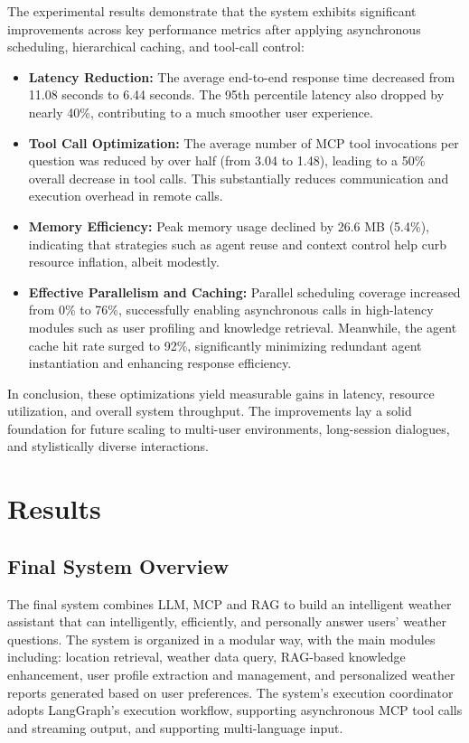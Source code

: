 \documentclass[final-report]{report-template}
\begin{document}
The experimental results demonstrate that the system exhibits significant improvements across key performance metrics after applying asynchronous scheduling, hierarchical caching, and tool-call control:

\begin{itemize}
    \item \textbf{Latency Reduction:} The average end-to-end response time decreased from 11.08 seconds to 6.44 seconds. The 95th percentile latency also dropped by nearly 40\%, contributing to a much smoother user experience.
    
    \item \textbf{Tool Call Optimization:} The average number of MCP tool invocations per question was reduced by over half (from 3.04 to 1.48), leading to a 50\% overall decrease in tool calls. This substantially reduces communication and execution overhead in remote calls.
    
    \item \textbf{Memory Efficiency:} Peak memory usage declined by 26.6 MB (5.4\%), indicating that strategies such as agent reuse and context control help curb resource inflation, albeit modestly.
    
    \item \textbf{Effective Parallelism and Caching:} Parallel scheduling coverage increased from 0\% to 76\%, successfully enabling asynchronous calls in high-latency modules such as user profiling and knowledge retrieval. Meanwhile, the agent cache hit rate surged to 92\%, significantly minimizing redundant agent instantiation and enhancing response efficiency.
\end{itemize}

In conclusion, these optimizations yield measurable gains in latency, resource utilization, and overall system throughput. The improvements lay a solid foundation for future scaling to multi-user environments, long-session dialogues, and stylistically diverse interactions.



\section{Results}

\subsection{Final System Overview}

The final system combines LLM, MCP and RAG to build an intelligent weather assistant that can intelligently, efficiently, and personally answer users' weather questions. The system is organized in a modular way, with the main modules including: location retrieval, weather data query, RAG-based knowledge enhancement, user profile extraction and management, and personalized weather reports generated based on user preferences. The system's execution coordinator adopts LangGraph's execution workflow, supporting asynchronous MCP tool calls and streaming output, and supporting multi-language input.
\end{document}

